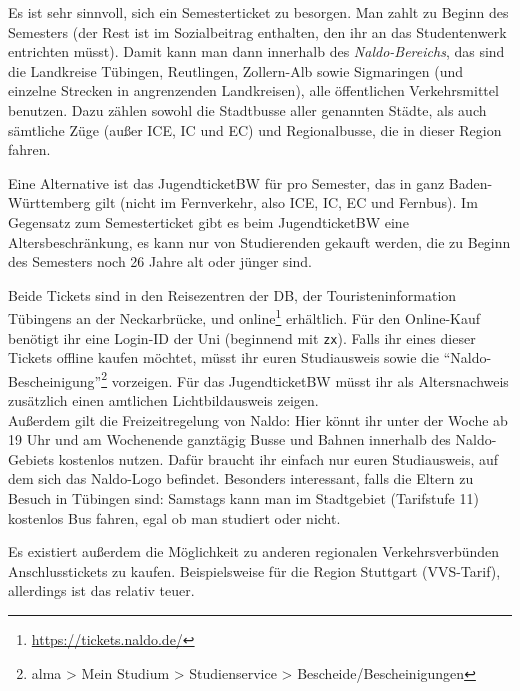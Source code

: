 

Es ist sehr sinnvoll, sich ein Semesterticket zu besorgen.  Man zahlt
  zu Beginn des Semesters \semesterticketpreis (der Rest ist im Sozialbeitrag
  enthalten, den ihr an das Studentenwerk entrichten müsst).  Damit
  kann man dann innerhalb des \emph{Naldo-Bereichs}, das sind die
  Landkreise Tübingen, Reutlingen, Zollern-Alb sowie Sigmaringen
  (und einzelne Strecken in angrenzenden Landkreisen), alle
  öffentlichen Verkehrsmittel benutzen. Dazu zählen sowohl die
  Stadtbusse aller genannten Städte, als auch sämtliche Züge (außer ICE, IC und EC) und
  Regionalbusse, die in dieser Region fahren.

Eine Alternative ist das JugendticketBW für \jugendticketbwpreis pro Semester,
  das in ganz Baden-Württemberg gilt (nicht im Fernverkehr, also ICE, IC, EC und Fernbus).
  Im Gegensatz zum Semesterticket gibt es beim JugendticketBW eine Altersbeschränkung,
  es kann nur von Studierenden gekauft werden, die zu Beginn des Semesters noch 26 Jahre alt oder jünger sind.

Beide Tickets sind in den Reisezentren der DB, der Touristeninformation Tübingens an der Neckarbrücke, und
  online\footnote{\url{https://tickets.naldo.de/}} erhältlich.
  Für den Online-Kauf benötigt ihr eine Login-ID der Uni (beginnend mit \texttt{zx}). Falls ihr eines
  dieser Tickets offline kaufen möchtet, müsst ihr euren Studiausweis sowie die "`Naldo-Bescheinigung"'\footnote{alma > Mein Studium > Studienservice > Bescheide/Bescheinigungen}
  vorzeigen. Für das JugendticketBW müsst ihr als Altersnachweis zusätzlich einen amtlichen Lichtbildausweis zeigen. \\
  Außerdem gilt die Freizeitregelung von Naldo: Hier könnt ihr unter der Woche ab 19 Uhr und am Wochenende ganztägig
  Busse und Bahnen innerhalb des Naldo-Gebiets kostenlos nutzen. Dafür braucht ihr einfach nur euren Studiausweis, auf
  dem sich das Naldo-Logo befindet.
  Besonders interessant, falls die Eltern zu Besuch in Tübingen sind: Samstags kann man im Stadtgebiet (Tarifstufe 11) kostenlos Bus fahren, egal ob man studiert oder nicht.

Es existiert außerdem die Möglichkeit zu anderen regionalen Verkehrsverbünden Anschlusstickets zu kaufen.
Beispielsweise für die Region Stuttgart (VVS-Tarif), allerdings ist das relativ teuer.

